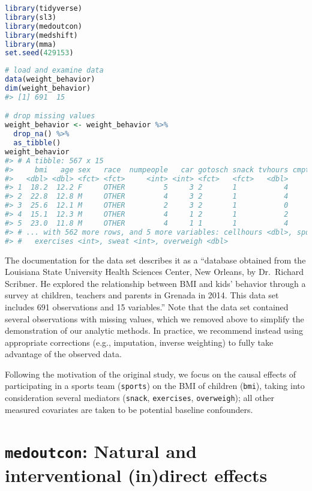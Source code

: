 \documentclass[
  12pt,
]{book}
\newcommand{\passthrough}[1]{#1}
\theoremstyle{definition}
\theoremstyle{definition}
\theoremstyle{definition}
\newcommand{\1}{\mathbbm{1}}
\begin{document}
\begin{lstlisting}[language=R]
library(tidyverse)
library(sl3)
library(medoutcon)
library(medshift)
library(mma)
set.seed(429153)
\end{lstlisting}

\begin{lstlisting}[language=R]
# load and examine data
data(weight_behavior)
dim(weight_behavior)
#> [1] 691  15

# drop missing values
weight_behavior <- weight_behavior %>%
  drop_na() %>%
  as_tibble()
weight_behavior
#> # A tibble: 567 x 15
#>     bmi   age sex   race  numpeople   car gotosch snack tvhours cmpthours
#>   <dbl> <dbl> <fct> <fct>     <int> <int> <fct>   <fct>   <dbl>     <dbl>
#> 1  18.2  12.2 F     OTHER         5     3 2       1           4         0
#> 2  22.8  12.8 M     OTHER         4     3 2       1           4         2
#> 3  25.6  12.1 M     OTHER         2     3 2       1           0         2
#> 4  15.1  12.3 M     OTHER         4     1 2       1           2         1
#> 5  23.0  11.8 M     OTHER         4     1 1       1           4         3
#> # ... with 562 more rows, and 5 more variables: cellhours <dbl>, sports <fct>,
#> #   exercises <int>, sweat <int>, overweigh <dbl>
\end{lstlisting}

The documentation for the data set describes it as a ``database obtained from the
Louisiana State University Health Sciences Center, New Orleans, by Dr.~Richard
Scribner. He explored the relationship between BMI and kids' behavior through a
survey at children, teachers and parents in Grenada in 2014. This data set
includes 691 observations and 15 variables.'' Note that the data set contained
several observations with missing values, which we removed above to simplify the
demonstration of our analytic methods. In practice, we recommend instead using
appropriate corrections (e.g., imputation, inverse weighting) to fully take
advantage of the observed data.

Following the motivation of the original study, we focus on the causal effects
of participating in a sports team (\passthrough{\lstinline!sports!}) on the BMI of children (\passthrough{\lstinline!bmi!}),
taking into consideration several mediators (\passthrough{\lstinline!snack!}, \passthrough{\lstinline!exercises!}, \passthrough{\lstinline!overweigh!});
all other measured covariates are taken to be potential baseline confounders.

\hypertarget{medoutcon-natural-and-interventional-indirect-effects}{%
\section{\texorpdfstring{\texttt{medoutcon}: Natural and interventional (in)direct effects}{medoutcon: Natural and interventional (in)direct effects}}\label{medoutcon-natural-and-interventional-indirect-effects}}
\end{document}
